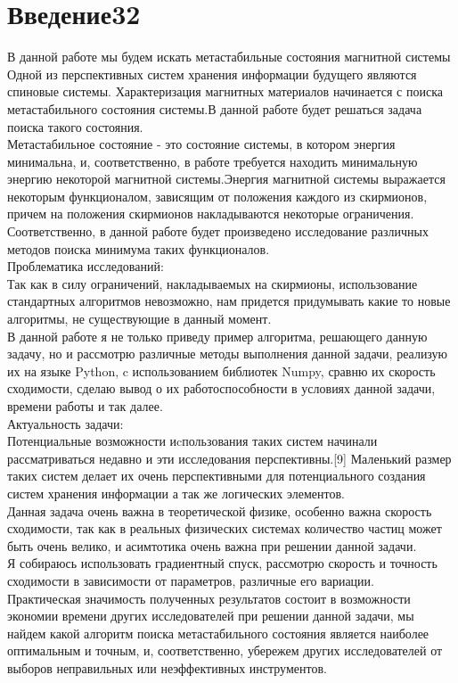 \documentclass[ 12pt,x11names]{article}
\begin{document}
    \tableofcontents %
    \clearpage
    \section{Введение32}    \noindent
    В данной работе мы будем искать метастабильные состояния магнитной системы\\
        Одной из перспективных систем хранения информации будущего являются спиновые системы. Характеризация магнитных материалов начинается с  поиска метастабильного состояния системы.В данной работе будет решаться задача поиска такого состояния.\\
        Метастабильное состояние - это состояние системы, в котором энергия минимальна, и, соответственно, в работе требуется находить минимальную энергию некоторой магнитной системы.Энергия магнитной системы выражается некоторым функционалом, зависящим от положения каждого из скирмионов, причем на положения скирмионов накладываются некоторые ограничения. Соответственно, в данной работе будет произведено исследование различных методов поиска минимума таких функционалов.\\
    Проблематика исследований:\\
     Так как в силу ограничений, накладываемых на скирмионы, использование стандартных алгоритмов невозможно, нам придется придумывать какие то новые алгоритмы, не существующие в данный момент.\\
    В данной работе я не только приведу пример алгоритма, решающего данную задачу, но и   рассмотрю различные методы выполнения данной задачи, реализую их на языке Python, c использованием библиотек Numpy, сравню их скорость сходимости, сделаю вывод о их работоспособности в условиях данной задачи, времени работы и так далее.\\
    Актуальность задачи:\\
     Потенциальные возможности иcпользования таких систем начинали рассматриваться недавно и эти исследования перспективны.[9]
     Маленький размер таких систем делает их очень перспективными для потенциального создания систем хранения информации а так же логических элементов.\\
    Данная задача очень важна в теоретической физике, особенно важна скорость сходимости, так как в реальных физических системах количество частиц может быть очень велико, и асимтотика очень важна при решении данной задачи.\\
    Я собираюсь использовать градиентный спуск, рассмотрю скорость и точность сходимости в зависимости от параметров, различные его вариации.\\
     Практическая значимость полученных результатов состоит в возможности экономии времени других исследователей при решении данной задачи, мы найдем какой алгоритм поиска метастабильного состояния является наиболее оптимальным и точным, и, соответственно, убережем других исследователей от выборов неправильных или неэффективных инструментов.\\
\end{document}
